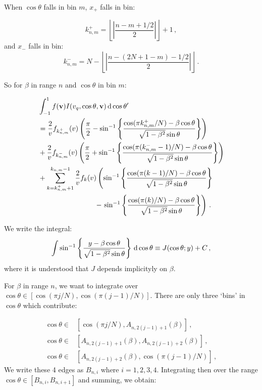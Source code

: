 
When $\cos\theta$ falls in bin $m$, $x_+$ falls in bin:

\begin{equation}
k^{+}_{n,m} = \left \lfloor{\left|\frac{n-m+1/2}{2}\right|}\right \rfloor + 1\,,
\end{equation}
and $x_-$ falls in bin:
\begin{equation}
k^{-}_{n,m} = N - \left \lfloor{\left|\frac{n-(2N+1 -m)-1/2}{2}\right|}\right \rfloor\,.
\end{equation}

So for $\beta$ in range $n$ and $\cos\theta$ in bin $m$:

\begin{align*}
& \int_{-1}^{1} f(\textbf{v}) I(v_q, \cos\theta, \textbf{v}) \, \mathrm{d}\cos\theta'\\
&= \frac{2}{v} f_{k_{n,m}^+}(v) \left( \frac{\pi}{2} - \sin^{-1}\left\{\frac{\cos(\pi k_{n,m}^{+}/N) - \beta \cos\theta}{\sqrt{1-\beta^2}\sin\theta}\right\}\right)\\
&+ \frac{2}{v} f_{k_{n,m}^-}(v) \left( \frac{\pi}{2} + \sin^{-1}\left\{\frac{\cos(\pi (k_{n,m}^{-}-1)/N) - \beta \cos\theta}{\sqrt{1-\beta^2}\sin\theta}\right\}\right)\\
&+ \sum_{k = k_{n,m}^+ +1}^{k_{n,m}-1} \frac{2}{v} f_{k}(v) \left( \sin^{-1}\left\{\frac{\cos(\pi (k-1)/N) - \beta \cos\theta}{\sqrt{1-\beta^2}\sin\theta}\right\}\right. \\
&\qquad\qquad\qquad\qquad- \left.\sin^{-1}\left\{\frac{\cos(\pi (k)/N) - \beta \cos\theta}{\sqrt{1-\beta^2}\sin\theta}\right\}\right)\,.
\end{align*}

We write the integral:
\begin{equation}
\int \sin^{-1}\left\{\frac{y - \beta \cos\theta}{\sqrt{1-\beta^2}\sin\theta}\right\} \, \mathrm{d}\cos\theta \equiv J(\cos\theta; y) + C\,,
\end{equation}
where it is understood that $J$ depends implicityly on $\beta$. 

For $\beta$ in range $n$, we want to integrate over $\cos\theta \in [\cos(\pi j/N), \cos(\pi (j-1)/N)]$. There are only three `bins' in $\cos\theta$ which contribute:

\begin{align*}
\cos\theta \in & [\cos(\pi j/N), A_{n,2(j-1)+1}(\beta)]\,, \\
\cos\theta \in & [A_{n,2(j-1)+1}(\beta), A_{n,2(j-1)+2}(\beta)]\,, \\
\cos\theta \in & [A_{n,2(j-1)+2}(\beta), \cos(\pi (j-1)/N)]\,,
\end{align*}
We write these 4 edges as $B_{n, i}$ where $i = 1,2,3,4$. Integrating then over the range $\cos\theta \in [B_{n,i}, B_{n,i+1}]$ and summing, we obtain:

